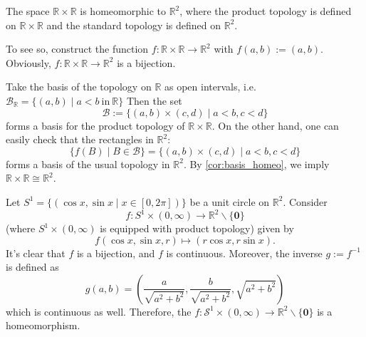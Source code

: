\begin{example}
\begin{example}
The space \(\mathbb{R} \times  \mathbb{R}\) is homeomorphic to \({\mathbb{R}}^{2}\), where the product topology is defined on \(\mathbb{R} \times  \mathbb{R}\) and the standard topology is defined on \({\mathbb{R}}^{2}\). 

To see so, construct the function \(f : \mathbb{R} \times  \mathbb{R} \rightarrow  {\mathbb{R}}^{2}\) with \(f\left({a,b}\right)  :=\left({a,b}\right)\). Obviously, \(f : \mathbb{R} \times  \mathbb{R} \rightarrow  {\mathbb{R}}^{2}\) is a bijection.

Take the basis of the topology on \(\mathbb{R}\) as open intervals, i.e.
\(
\mathcal{B}_{\mathbb{R}} = \{ \left({a,b}\right)  \mid  a < b\ \text{in}\ \mathbb{R}\}
\)
Then the set 
\[\mathcal{B} := \{ \left({a,b}\right)  \times  \left({c,d}\right)  \mid  a < b,c < d\}\] 
forms a basis for the product topology of $\mathbb{R} \times \mathbb{R}$. On the other hand, one can easily check that the rectangles in $\mathbb{R}^2$:
\[
\{ f\left(B\right)  \mid  B \in  \mathcal{B}\}  = \{ \left({a,b}\right)  \times  \left({c,d}\right)  \mid  a < b,c < d\}
\]
forms a basis of the usual topology in \({\mathbb{R}}^{2}\). By \autoref{cor:basis_homeo}, we imply \(\mathbb{R} \times  \mathbb{R} \cong  {\mathbb{R}}^{2}\).
\end{example}


\begin{example} Let \({S}^{1} = \{ \left({\cos x,\sin x \mid  x \in  \left\lbrack  {0,{2\pi}}\right\rbrack }\right) \}\) be a unit circle on \({\mathbb{R}}^{2}\). Consider 
\[f : {S}^{1} \times  \left({0,\infty}\right)  \rightarrow  {\mathbb{R}}^{2} \smallsetminus  \{ \mathbf{0}\}\] 
(where $S^1 \times (0, \infty)$ is equipped with product topology) given by
\[
f\left({\cos x,\sin x,r}\right)  \mapsto  \left({r\cos x,r\sin x}\right).
\]
It’s clear that \(f\) is a bijection, and \(f\) is continuous. Moreover, the inverse \(g := {f}^{-1}\) is defined as
\[
g\left({a,b}\right)  = \left({\frac{a}{\sqrt{{a}^{2} + {b}^{2}}},\frac{b}{\sqrt{{a}^{2} + {b}^{2}}},\sqrt{{a}^{2} + {b}^{2}}}\right)
\]
which is continuous as well. Therefore, the \(f : {\mathcal{S}}^{1} \times  \left({0,\infty}\right)  \rightarrow  {\mathbb{R}}^{2} \smallsetminus  \{ \mathbf{0}\}\) is a homeomorphism.
\end{example}


\end{example}
